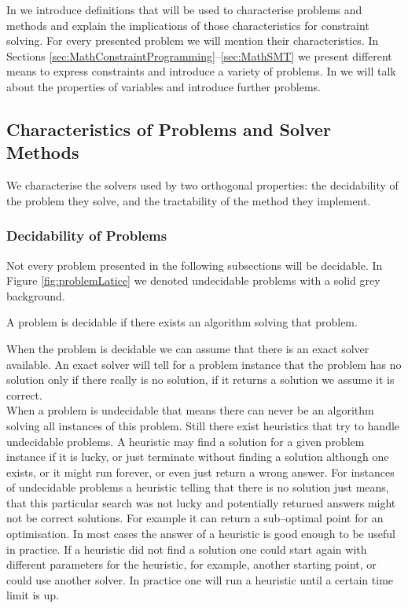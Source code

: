 In  we introduce definitions that will be used to characterise problems and methods and explain the implications of those characteristics for constraint solving. For every presented problem we will mention their characteristics. In Sections \ref{sec:MathConstraintProgramming}--\ref{sec:MathSMT} we present different means to express constraints and introduce a variety of problems. In  we will talk about the properties of variables and introduce further problems.
\subsection{Characteristics of Problems and Solver Methods}
\label{sec:computability}
We characterise the solvers used by two orthogonal properties: the decidability of the problem they  solve, and the tractability of the method they implement.
\subsubsection{Decidability of Problems}
Not every problem presented in the following subsections will be decidable. In Figure \ref{fig:problemLatice} we denoted undecidable problems with a solid grey background. 
\begin{definition}[decidability]
A problem is decidable if there exists an algorithm solving that problem. 
\end{definition}
When the problem is decidable we can assume that there is an exact solver available. An exact solver will tell for a problem instance that the problem has no solution only if there really is no solution, if it returns a solution we assume it is correct.\\
When a problem is undecidable that means there can never be an algorithm solving all instances of this problem. 
Still there exist heuristics that try to handle undecidable problems. A heuristic may find a solution for a given problem instance if it is lucky, or just terminate without finding a solution although one exists, or it might run forever, or even just return a wrong answer. For instances of undecidable problems a heuristic telling that there is no solution just means, that this particular search was not lucky and potentially returned answers might not be correct solutions. For example it can return a sub--optimal point for an optimisation. In most cases the answer of a heuristic is good enough to be useful in practice. 
If a heuristic did not find a solution one could start again with different parameters for the heuristic, for example, another starting point, or could use another solver. In practice one will run a heuristic until a certain time limit is up.
